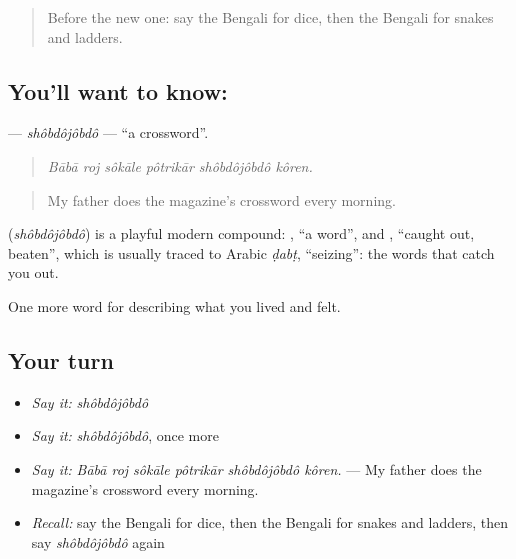 \label{lesson:BN-C518-shobdojobdo}



\begin{quote}
Before the new one: say the Bengali for dice, then the Bengali for snakes and ladders.
\end{quote}

\subsection*{You'll want to know: }
\textbf{} — \emph{shôbdôjôbdô} — \textquotedblleft{}a crossword\textquotedblright{}.

\begin{quote}
     
\end{quote}

\begin{quote}
\emph{Bābā roj sôkāle pôtrikār shôbdôjôbdô kôren.}
\end{quote}

\begin{quote}
My father does the magazine's crossword every morning.
\end{quote}

\begin{cousinweb}
\textbf{} (\emph{shôbdôjôbdô}) is a playful modern compound: , \textquotedblleft{}a word\textquotedblright{}, and , \textquotedblleft{}caught out, beaten\textquotedblright{}, which is usually traced to Arabic \emph{ḍabṭ}, \textquotedblleft{}seizing\textquotedblright{}: the words that catch you out.
\end{cousinweb}

\begin{grammarlens}[title={What you've built}]
One more word for describing what you lived and felt.
\end{grammarlens}

\subsection*{Your turn}
\begin{itemize}
\raggedright
  \item \emph{Say it:} \emph{shôbdôjôbdô}
  \item \emph{Say it:} \emph{shôbdôjôbdô}, once more
  \item \emph{Say it:} \emph{Bābā roj sôkāle pôtrikār shôbdôjôbdô kôren.} — My father does the magazine's crossword every morning.
  \item \emph{Recall:} say the Bengali for dice, then the Bengali for snakes and ladders, then say \emph{shôbdôjôbdô} again
\end{itemize}

